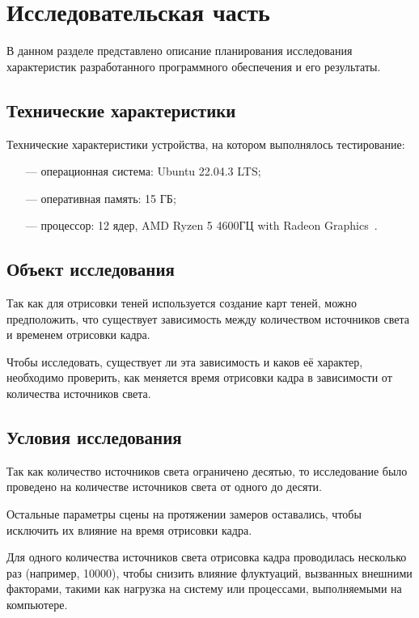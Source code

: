 \chapter{Исследовательская часть}

В данном разделе представлено описание планирования исследования характеристик разработанного программного обеспечения и его результаты.

\section{Технические характеристики}

Технические характеристики устройства, на котором выполнялось тестирование:

\begin{itemize}
	\item[---] операционная система: Ubuntu \cite{ubuntu} 22.04.3 LTS;
	\item[---] оперативная память: 15 ГБ;
	\item[---] процессор: 12 ядер, AMD Ryzen 5 4600ГЦ with Radeon Graphics~\cite{amd}.
\end{itemize}

\section{Объект исследования}

Так как для отрисовки теней используется создание карт теней, можно предположить, что существует зависимость между количеством источников света и временем отрисовки кадра.

Чтобы исследовать, существует ли эта зависимость и каков её характер, необходимо проверить, как меняется время отрисовки кадра в зависимости от количества источников света.

\section{Условия исследования}

Так как количество источников света ограничено десятью, то исследование было проведено на количестве источников света от одного до десяти.

Остальные параметры сцены на протяжении замеров оставались, чтобы исключить их влияние на время отрисовки кадра.

Для одного количества источников света отрисовка кадра проводилась несколько раз (например, 10000), чтобы снизить влияние флуктуаций, вызванных внешними факторами, такими как нагрузка на систему или процессами, выполняемыми на компьютере.

